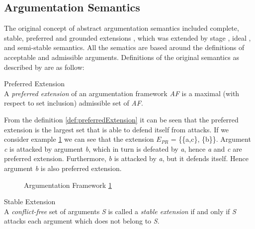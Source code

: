 \subsection{Argumentation Semantics}
\label{sec:argumentationSemantics}


The original concept of abstract argumentation semantics included complete, stable, preferred and grounded extensions \citep{dung1995}, which was extended by stage \citep{verheij1996two}, ideal \citep{dung2007computing}, and semi-stable \citep{caminada2006semi} semantics. All the sematics are based around the definitions of acceptable and admissible arguments. Definitions of the original semantics as described by \citet{dung1995} are as follow: 

\begin{definition}{Preferred Extension}
\label{def:preferredExtension}\\
A \textit{preferred extension} of an argumentation framework \textit{AF} is a maximal (with respect to set inclusion) admissible set of \textit{AF}.
\end{definition}


From the definition \ref{def:preferredExtension} it can be seen that the preferred extension is the largest set that is able to defend itself from attacks. If we consider example \ref{fig:af1} we can see that the extension \textit{$E_{PR}$} = \{\{a,c\}, \{b\}\}. Argument \textit{c} is attacked by argument \textit{b}, which in turn is defeated by \textit{a}, hence \textit{a} and \textit{c} are preferred extension. Furthermore, \textit{b} is attacked by \textit{a}, but it defends itself. Hence argument \textit{b} is also preferred extension.

\begin{figure}[h]
\centering
{}
\caption{Argumentation Framework \ref{fig:af1}}
\label{fig:af1}
\end{figure}

\begin{definition}{Stable Extension}
\label{def:stableExtension}\\
A \textit{conflict-free} set of arguments \textit{S} is called a \textit{stable extension} if and only if \textit{S} attacks each argument which does not belong to \textit{S}.
\end{definition}

